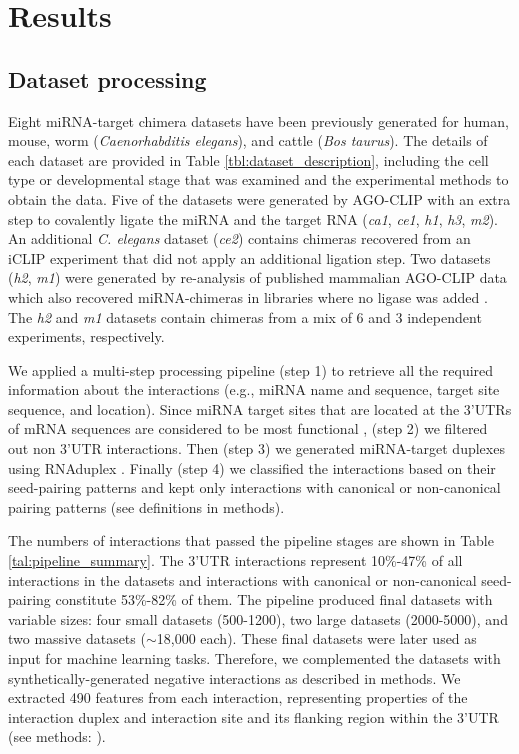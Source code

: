 \documentclass{bmcart}
\begin{document}

\clearpage
\section*{Results}
\subsection*{Dataset processing}
Eight miRNA-target chimera datasets have been previously generated for human, mouse, worm (\textit{Caenorhabditis elegans}), and cattle (\textit{Bos taurus}).
The details of each dataset are provided in Table \ref{tbl:dataset_description}, including the cell type or developmental stage that was examined and the experimental methods to obtain the data. Five of the datasets were generated by AGO-CLIP with an extra step to covalently ligate the miRNA and the target RNA (\textit{ca1}, \textit{ce1}, \textit{h1},  \textit{h3}, \textit{m2}). An additional \textit{C. elegans} dataset (\textit{ce2}) contains chimeras recovered from an iCLIP experiment that did not apply an additional ligation step. Two datasets (\textit{h2}, \textit{m1}) were generated by re-analysis of published mammalian AGO-CLIP data which also recovered miRNA-chimeras in libraries where no ligase was added \cite{grosswendt2014unambiguous}. The \textit{h2} and \textit{m1} datasets contain chimeras from a mix of 6 and 3 independent experiments, respectively.



We applied a multi-step processing pipeline (step 1) to retrieve all the required information about the interactions (e.g., miRNA name and sequence, target site sequence, and location). Since miRNA target sites that are located at the 3'UTRs of mRNA sequences are considered to be most functional \cite{menor2014mirmark, baek2008impact}, (step 2) we filtered out non 3'UTR interactions. Then (step 3) we generated miRNA-target duplexes using RNAduplex \cite{lorenz2011viennarna}. Finally (step 4) we classified the interactions based on their seed-pairing patterns and kept only interactions with canonical or non-canonical pairing patterns (see definitions in methods). 


The numbers of interactions that passed the pipeline stages are shown in Table \ref{tal:pipeline_summary}. The 3'UTR interactions represent 10\%-47\% of all interactions in the datasets and interactions with canonical or non-canonical seed-pairing constitute 53\%-82\% of them. The pipeline produced final datasets with variable sizes: four small datasets (500-1200), two large datasets (2000-5000), and two massive datasets ($\sim$18,000 each). These final datasets were later used as input for machine learning tasks. Therefore, we complemented the datasets with synthetically-generated negative interactions as described in methods. We extracted 490 features from each interaction, representing properties of the interaction duplex and interaction site and its flanking region within the 3'UTR (see methods: ).
\end{document}
